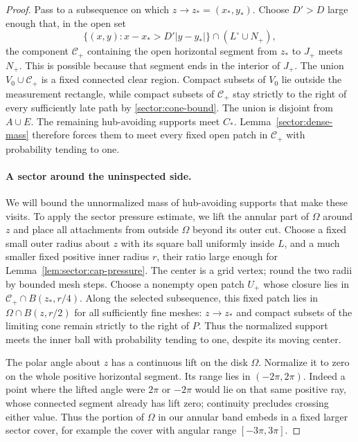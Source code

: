 \begin{proof}
Pass to a subsequence on which $z\to z_*=(x_*,y_*)$.  Choose $D'>D$
large enough that, in the open set
\[
 \{(x,y):x-x_*>D'|y-y_*|\}\cap(L^\circ\cup N_+),
\]
the component $\mathcal C_+$ containing the open horizontal segment
from $z_*$ to $J_+$ meets $N_+$.  This is possible because that
segment ends in the interior of $J_+$.  The union
$V_0\cup\mathcal C_+$ is a fixed connected clear region.  Compact
subsets of $V_0$ lie outside the measurement rectangle, while compact
subsets of $\mathcal C_+$ stay strictly to the right of every sufficiently late
path by \eqref{sector:cone-bound}.  The union is
disjoint from $A\cup E$.  The remaining hub-avoiding supports meet $C_*$.
Lemma~\ref{sector:dense-mass} therefore forces them to meet every fixed
open patch in $\mathcal C_+$ with probability tending to one.

\paragraph{A sector around the uninspected side.}
We will bound the unnormalized mass of hub-avoiding supports that make
these visits.  To apply the sector pressure estimate, we lift the annular
part of $\Omega$ around $z$ and place all attachments from outside
$\Omega$ beyond its outer cut.
Choose a fixed small outer radius about $z$ with its square ball
uniformly inside $L$, and a much smaller fixed positive inner radius
$r$, their ratio large enough for
Lemma~\ref{lem:sector:cap-pressure}.  The center is a grid vertex;
round the two radii by bounded mesh steps.
Choose a nonempty open patch $U_+$ whose closure lies in
$\mathcal C_+\cap B(z_*,r/4)$.  Along the selected subsequence, this
fixed patch lies in $\Omega\cap B(z,r/2)$ for all sufficiently fine
meshes: $z\to z_*$ and compact subsets of the limiting cone remain
strictly to the right of $P$.  Thus the normalized support meets the
inner ball with probability tending to one, despite its moving center.

The polar angle about $z$ has a continuous lift on the disk $\Omega$.
Normalize it to zero on the whole positive horizontal segment.  Its
range lies in $(-2\pi,2\pi)$.  Indeed a point where the lifted angle
were $2\pi$ or $-2\pi$ would lie on that same positive ray, whose
connected segment already has lift zero; continuity precludes
crossing either value.  Thus the portion of $\Omega$ in our annular
band embeds in a fixed larger sector cover, for example the cover
with angular range $[-3\pi,3\pi]$.


\end{proof}
